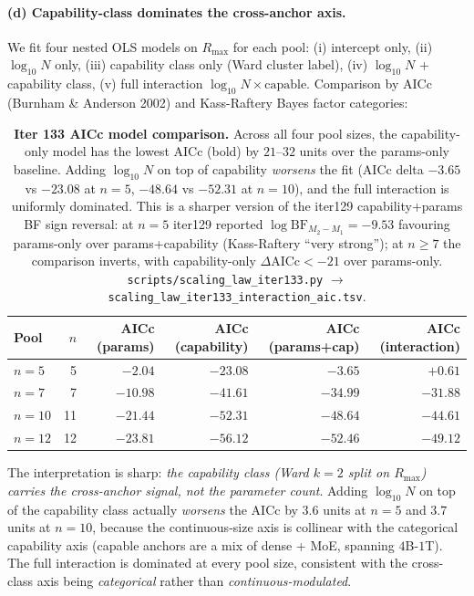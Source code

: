 \paragraph{(d) Capability-class dominates the cross-anchor axis.}
\label{par:scaling-iter133-class}
We fit four nested OLS models on $R_{\max}$ for each pool: (i)
intercept only, (ii) $\log_{10} N$ only, (iii) capability class
only (Ward cluster label), (iv) $\log_{10} N$ + capability class,
(v) full interaction $\log_{10} N \times \text{capable}$.
Comparison by AICc (Burnham \& Anderson 2002) and Kass-Raftery
Bayes factor categories:

\begin{table}[t]
  \centering
  \small
  \begin{tabular}{lrrrrr}
    \toprule
    Pool & $n$ & AICc (params) & AICc (capability) &
           AICc (params+cap) & AICc (interaction) \\
    \midrule
    $n=5$  &  5 & $-2.04$  & $\mathbf{-23.08}$ & $-3.65$  & $+0.61$ \\
    $n=7$  &  7 & $-10.98$ & $\mathbf{-41.61}$ & $-34.99$ & $-31.88$ \\
    $n=10$ & 11 & $-21.44$ & $\mathbf{-52.31}$ & $-48.64$ & $-44.61$ \\
    $n=12$ & 12 & $-23.81$ & $\mathbf{-56.12}$ & $-52.46$ & $-49.12$ \\
    \bottomrule
  \end{tabular}
  \caption{\textbf{Iter 133 AICc model comparison.}
    Across all four pool sizes, the capability-only model has the
    lowest AICc (bold) by $21$--$32$ units over the params-only
    baseline.  Adding $\log_{10} N$ on top of capability
    \emph{worsens} the fit (AICc delta $-3.65$ vs $-23.08$ at
    $n=5$, $-48.64$ vs $-52.31$ at $n=10$), and the full
    interaction is uniformly dominated.  This is a sharper
    version of the iter129 capability+params BF sign reversal:
    at $n=5$ iter129 reported $\log \mathrm{BF}_{M_2 - M_1} =
    -9.53$ favouring params-only over params+capability
    (Kass-Raftery ``very strong''); at $n \ge 7$ the comparison
    inverts, with capability-only $\Delta\text{AICc} < -21$
    over params-only.  \texttt{scripts/scaling\_law\_iter133.py}
    $\to$ \texttt{scaling\_law\_iter133\_interaction\_aic.tsv}.}
  \label{tab:scaling-iter133-aic}
\end{table}

The interpretation is sharp: \emph{the capability class (Ward
$k=2$ split on $R_{\max}$) carries the cross-anchor signal,
not the parameter count}.  Adding $\log_{10} N$ on top of the
capability class actually \emph{worsens} the AICc by $3.6$
units at $n=5$ and $3.7$ units at $n=10$, because the
continuous-size axis is collinear with the categorical
capability axis (capable anchors are a mix of dense + MoE,
spanning $4$B-$1$T).  The full interaction is dominated at
every pool size, consistent with the cross-class axis being
\emph{categorical} rather than \emph{continuous-modulated}.

